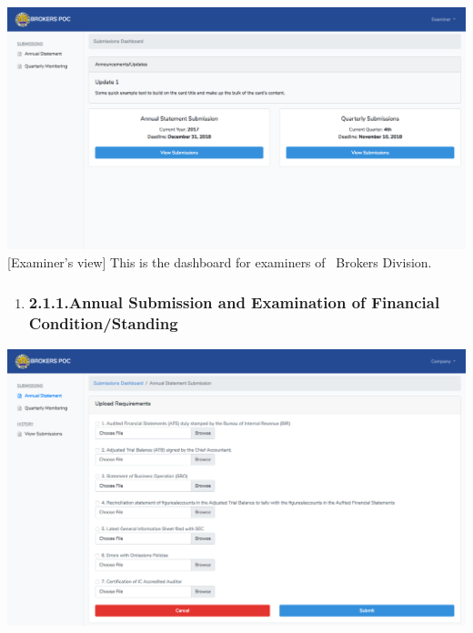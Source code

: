 \documentclass{article}
\begin{document}
\includegraphics[keepaspectratio=true]{up-ic-screens/image92}{}[Examiner’s view] This is the dashboard for examiners of
 Brokers Division.%

\begin{enumerate}[noitemsep,topsep=\mdcompacttopsep]%

\item{}
\subsubsection{2.1.1.\hspace*{0.5em}Annual Submission and Examination of Financial Condition/Standing}\label{sec-annual-submission-and-examination-of-financial-conditionstanding}%
\end{enumerate}%

\noindent{}\includegraphics[keepaspectratio=true]{up-ic-screens/image108}{}%
\end{document}
